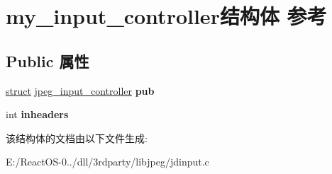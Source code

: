\hypertarget{structmy__input__controller}{}\section{my\+\_\+input\+\_\+controller结构体 参考}
\label{structmy__input__controller}
\subsection*{Public 属性}
\begin{DoxyCompactItemize}
\item 
\mbox{\label{structmy__input__controller_a4ccad4a8586a7c91d0d71b45d0e78514}} 
\hyperlink{interfacestruct}{struct} \hyperlink{structjpeg__input__controller}{jpeg\+\_\+input\+\_\+controller} {\bfseries pub}
\item 
\mbox{\label{structmy__input__controller_a722193efbf3a95d55c75c027be93fd31}} 
int {\bfseries inheaders}
\end{DoxyCompactItemize}


该结构体的文档由以下文件生成\+:\begin{DoxyCompactItemize}
\item 
E\+:/\+React\+O\+S-\/0../dll/3rdparty/libjpeg/jdinput.\+c\end{DoxyCompactItemize}
